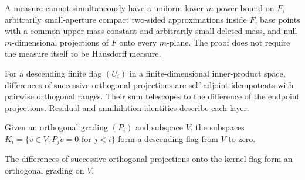 \begin{lemma}
\label{lem:two-sided-packing-core}

A measure cannot simultaneously have a uniform lower $m$-power bound on $F$, arbitrarily small-aperture compact two-sided approximations inside $F$, base points with a common upper mass constant and arbitrarily small deleted mass, and null $m$-dimensional projections of $F$ onto every $m$-plane. The proof does not require the measure itself to be Hausdorff measure.
\end{lemma}

\begin{lemma}
\label{lem:nested-orthogonal-layers}

For a descending finite flag $(U_i)$ in a finite-dimensional inner-product space, differences of successive orthogonal projections are self-adjoint idempotents with pairwise orthogonal ranges. Their sum telescopes to the difference of the endpoint projections. Residual and annihilation identities describe each layer.
\end{lemma}

\begin{lemma}
\label{lem:kernel-grading-flag}

Given an orthogonal grading $(P_i)$ and subspace $V$, the subspaces $K_i=\{v\in V:P_jv=0\text{ for }j<i\}$ form a descending flag from $V$ to zero.
\end{lemma}

\begin{lemma}
\label{lem:kernel-flag-layer-grading}

The differences of successive orthogonal projections onto the kernel flag form an orthogonal grading on $V$.
\end{lemma}

